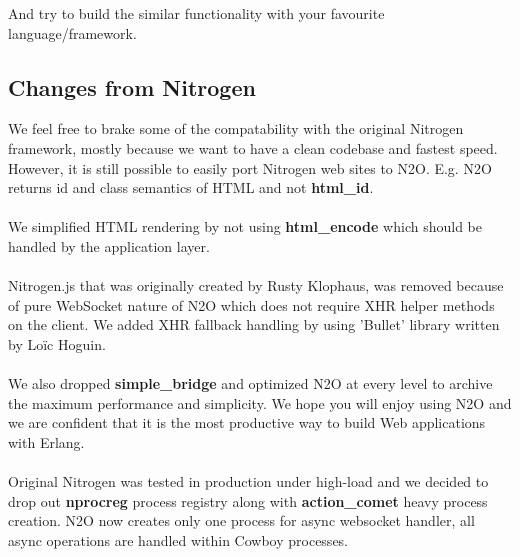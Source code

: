 And try to build the similar functionality with your favourite language/framework.

\subsection*{Changes from Nitrogen}
We feel free to brake some of the compatability with the original
Nitrogen framework, mostly because we want to have a clean codebase
and fastest speed. However, it is still possible to easily port
Nitrogen web sites to N2O. E.g. N2O returns id and class semantics
of HTML and not {\bf html\_id}.

\paragraph{}
We simplified HTML rendering by not using
{\bf html\_encode} which should be handled by the application layer.

\paragraph{}
Nitrogen.js that was originally created by Rusty Klophaus,
was removed because of pure WebSocket nature of N2O which does not
require XHR helper methods on the client. We added XHR fallback
handling by using 'Bullet' library written by Loïc Hoguin.

\paragraph{}
We also dropped {\bf simple\_bridge} and optimized N2O at every level to
archive the maximum performance and simplicity. We hope you will enjoy
using N2O and we are confident that it is the most productive way to
build Web applications with Erlang.

\paragraph{}
Original Nitrogen was tested in production under high-load and we
decided to drop out {\bf nprocreg} process registry along 
with {\bf{action\_comet}} heavy process creation. N2O now creates
only one process for async websocket handler, all async operations
are handled within Cowboy processes.
